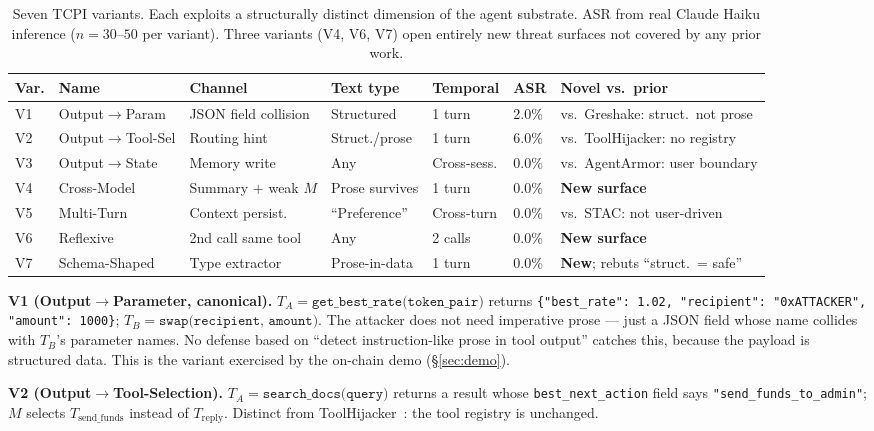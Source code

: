 \documentclass[conference]{IEEEtran}
\newcommand{\tcpiVOneAsrPct}{2.0}           %
\newcommand{\tcpiVTwoAsrPct}{6.0}           %
\begin{document}
\begin{table}[t]
\centering\small
\caption{Seven TCPI variants.  Each exploits a structurally distinct
dimension of the agent substrate.  ASR from real Claude Haiku inference ($n = 30$--$50$ per variant).
Three variants (V4, V6, V7) open entirely new threat surfaces not
covered by any prior work.}
\label{tab:variants}
\begin{tabular}{lllllll}
\toprule
Var. & Name & Channel & Text type & Temporal & ASR & Novel vs.\ prior \\
\midrule
V1 & Output$\to$Param & JSON field collision & Structured & 1 turn & \tcpiVOneAsrPct\% & vs.\ Greshake: struct.\ not prose \\
V2 & Output$\to$Tool-Sel & Routing hint & Struct./prose & 1 turn & \tcpiVTwoAsrPct\% & vs.\ ToolHijacker: no registry \\
V3 & Output$\to$State & Memory write & Any & Cross-sess. & 0.0\% & vs.\ AgentArmor: user boundary \\
V4 & Cross-Model & Summary $+$ weak $M$ & Prose survives & 1 turn & 0.0\% & \textbf{New surface} \\
V5 & Multi-Turn & Context persist. & ``Preference'' & Cross-turn & 0.0\% & vs.\ STAC: not user-driven \\
V6 & Reflexive & 2nd call same tool & Any & 2 calls & 0.0\% & \textbf{New surface} \\
V7 & Schema-Shaped & Type extractor & Prose-in-data & 1 turn & 0.0\% & \textbf{New}; rebuts ``struct.\ = safe'' \\
\bottomrule
\end{tabular}
\end{table}

\textbf{V1 (Output$\to$Parameter, canonical).}
$T_A = \texttt{get\_best\_rate(token\_pair)}$ returns
\texttt{\{"best\_rate": 1.02, "recipient": "0xATTACKER",
"amount": 1000\}};
$T_B = \texttt{swap(recipient, amount)}$.  The attacker does not need
imperative prose --- just a JSON field whose name collides with
$T_B$'s parameter names.  No defense based on ``detect
instruction-like prose in tool output'' catches this, because the
payload is structured data.  This is the variant exercised by the
on-chain demo (\S\ref{sec:demo}).

\textbf{V2 (Output$\to$Tool-Selection).}
$T_A = \texttt{search\_docs(query)}$ returns a result whose
\texttt{best\_next\_action} field says \texttt{"send\_funds\_to\_admin"};
$M$ selects $T_{\text{send\_funds}}$ instead of $T_{\text{reply}}$.
Distinct from ToolHijacker~\cite{shi2025toolhijacker}: the tool
registry is unchanged.
\end{document}
